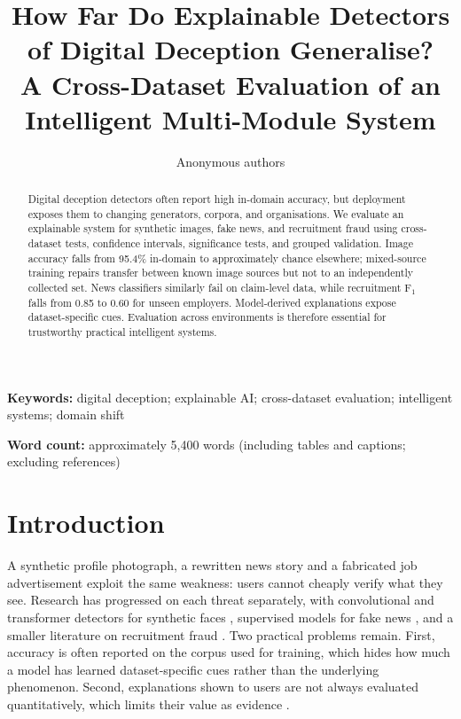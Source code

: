 \documentclass[11pt,a4paper]{article}
\title{How Far Do Explainable Detectors of Digital Deception Generalise?\\
A Cross-Dataset Evaluation of an Intelligent Multi-Module System}
\author{Anonymous authors}
\date{}
\begin{document}
\maketitle

\begin{abstract}
Digital deception detectors often report high in-domain accuracy, but deployment exposes them to changing generators, corpora, and organisations. We evaluate an explainable system for synthetic images, fake news, and recruitment fraud using cross-dataset tests, confidence intervals, significance tests, and grouped validation. Image accuracy falls from 95.4\% in-domain to approximately chance elsewhere; mixed-source training repairs transfer between known image sources but not to an independently collected set. News classifiers similarly fail on claim-level data, while recruitment F$_1$ falls from 0.85 to 0.60 for unseen employers. Model-derived explanations expose dataset-specific cues. Evaluation across environments is therefore essential for trustworthy practical intelligent systems.
\end{abstract}

\textbf{Keywords:} digital deception; explainable AI; cross-dataset evaluation; intelligent systems; domain shift

\textbf{Word count:} approximately 5,400 words (including tables and captions; excluding references)

\section{Introduction}
A synthetic profile photograph, a rewritten news story and a fabricated job advertisement exploit the same weakness: users cannot cheaply verify what they see. Research has progressed on each threat separately, with convolutional and transformer detectors for synthetic faces \cite{soudy2024deepfake,yan2023deepfakebench}, supervised models for fake news \cite{ahmed2017isot,verma2021welfake}, and a smaller literature on recruitment fraud \cite{naude2023recruitment,taneja2025fraudbert}. Two practical problems remain. First, accuracy is often reported on the corpus used for training, which hides how much a model has learned dataset-specific cues rather than the underlying phenomenon. Second, explanations shown to users are not always evaluated quantitatively, which limits their value as evidence \cite{tsigos2024quantitative}.
\end{document}
